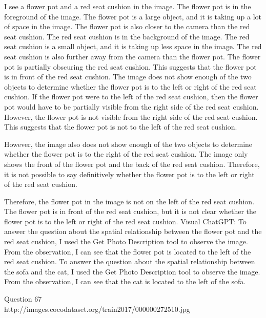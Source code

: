 \begin{enumerate}
    I see a flower pot and a red seat cushion in the image.
    The flower pot is in the foreground of the image. The flower pot is a large object, and it is taking up a lot of space in the image. The flower pot is also closer to the camera than the red seat cushion.
    The red seat cushion is in the background of the image. The red seat cushion is a small object, and it is taking up less space in the image. The red seat cushion is also further away from the camera than the flower pot.
    The flower pot is partially obscuring the red seat cushion. This suggests that the flower pot is in front of the red seat cushion.
    The image does not show enough of the two objects to determine whether the flower pot is to the left or right of the red seat cushion.
    If the flower pot were to the left of the red seat cushion, then the flower pot would have to be partially visible from the right side of the red seat cushion. However, the flower pot is not visible from the right side of the red seat cushion. This suggests that the flower pot is not to the left of the red seat cushion.
    
    However, the image also does not show enough of the two objects to determine whether the flower pot is to the right of the red seat cushion. The image only shows the front of the flower pot and the back of the red seat cushion. Therefore, it is not possible to say definitively whether the flower pot is to the left or right of the red seat cushion.
    
    Therefore, the flower pot in the image is not on the left of the red seat cushion. The flower pot is in front of the red seat cushion, but it is not clear whether the flower pot is to the left or right of the red seat cushion.
    \subitem Visual ChatGPT: To answer the question about the spatial relationship between the flower pot and the red seat cushion, I used the Get Photo Description tool to observe the image. From the observation, I can see that the flower pot is located to the left of the red seat cushion. To answer the question about the spatial relationship between the sofa and the cat, I used the Get Photo Description tool to observe the image. From the observation, I can see that the cat is located to the left of the sofa.
\end{enumerate}
Question 67\\
http://images.cocodataset.org/train2017/000000272510.jpg
